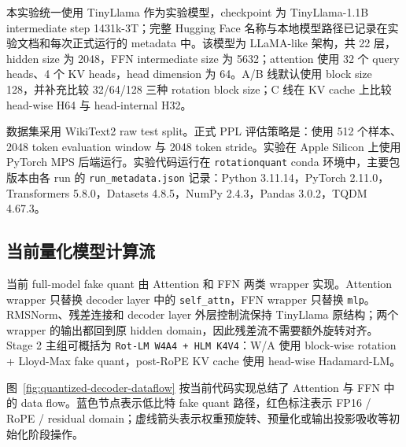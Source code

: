 \documentclass[lang=cn,chinesefont=nofont,a4paper,newtx]{elegantpaper}
\begin{document}
本实验统一使用 TinyLlama 作为实验模型，checkpoint 为 TinyLlama-1.1B intermediate step 1431k-3T；完整 Hugging Face 名称与本地模型路径已记录在实验文档和每次正式运行的 metadata 中。该模型为 LLaMA-like 架构，共 22 层，hidden size 为 2048，FFN intermediate size 为 5632；attention 使用 32 个 query heads、4 个 KV heads，head dimension 为 64。A/B 线默认使用 block size 128，并补充比较 32/64/128 三种 rotation block size；C 线在 KV cache 上比较 head-wise H64 与 head-internal H32。

数据集采用 WikiText2 raw test split。正式 PPL 评估策略是：使用 512 个样本、2048 token evaluation window 与 2048 token stride。实验在 Apple Silicon 上使用 PyTorch MPS 后端运行。实验代码运行在 \texttt{rotationquant} conda 环境中，主要包版本由各 run 的 \texttt{run\_metadata.json} 记录：Python 3.11.14，PyTorch 2.11.0，Transformers 5.8.0，Datasets 4.8.5，NumPy 2.4.3，Pandas 3.0.2，TQDM 4.67.3。

\subsection{当前量化模型计算流}

当前 full-model fake quant 由 Attention 和 FFN 两类 wrapper 实现。Attention wrapper 只替换 decoder layer 中的 \texttt{self\_attn}，FFN wrapper 只替换 \texttt{mlp}。RMSNorm、残差连接和 decoder layer 外层控制流保持 TinyLlama 原结构；两个 wrapper 的输出都回到原 hidden domain，因此残差流不需要额外旋转对齐。Stage 2 主组可概括为 \texttt{Rot-LM W4A4 + HLM K4V4}：W/A 使用 block-wise rotation + Lloyd-Max fake quant，post-RoPE KV cache 使用 head-wise Hadamard-LM。

图~\ref{fig:quantized-decoder-dataflow} 按当前代码实现总结了 Attention 与 FFN 中的 data flow。蓝色节点表示低比特 fake quant 路径，红色标注表示 FP16 / RoPE / residual domain；虚线箭头表示权重预旋转、预量化或输出投影吸收等初始化阶段操作。
\end{document}
